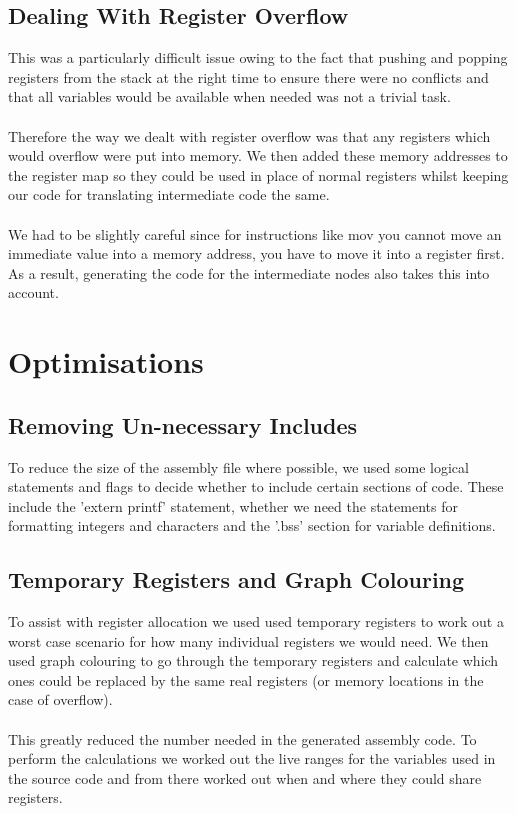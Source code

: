 \documentclass[a4wide, 11pt]{article}
\begin{document}
\subsection{Dealing With Register Overflow}
This was a particularly difficult issue owing to the fact that pushing and popping registers from the stack at the right time to ensure there were no conflicts and that all variables would be available when needed was not a trivial task.
\\\\
Therefore the way we dealt with register overflow was that any registers which would overflow were put into memory. We then added these memory addresses to the register map so they could be used in place of normal registers whilst keeping our code for translating intermediate code the same.
\\\\
We had to be slightly careful since for instructions like mov you cannot move an immediate value into a memory address, you have to move it into a register first. As a result, generating the code for the intermediate nodes also takes this into account.                                                                        

\section{Optimisations}

\subsection{Removing Un-necessary Includes}
To reduce the size of the assembly file where possible, we used some logical statements and flags to decide whether to include certain sections of code. These include the 'extern printf' statement, whether we need the statements for formatting integers and characters and the '.bss' section for variable definitions.

\subsection{Temporary Registers and Graph Colouring}
To assist with register allocation we used used temporary registers to work out a worst case scenario for how many individual registers we would need. We then used graph colouring to go through the temporary registers and calculate which ones could be replaced by the same real registers (or memory locations in the case of overflow).
\\\\
This greatly reduced the number needed in the generated assembly code. To perform the calculations we worked out the live ranges for the variables used in the source code and from there worked out when and where they could share registers.
\end{document}
